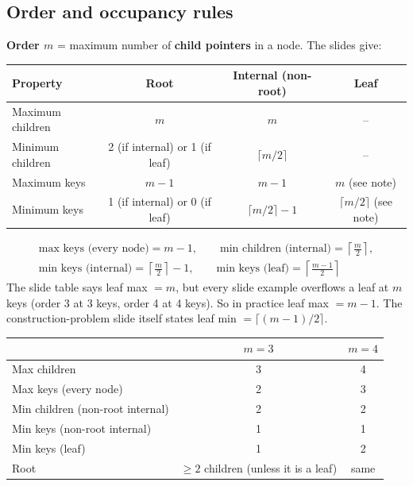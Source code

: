 \documentclass[10pt,a4paper]{article}
\begin{document}
\subsection{Order and occupancy rules}
\textbf{Order $m$} = maximum number of \textbf{child pointers} in a node. The slides give:

\begin{center}
\begin{tabular}{@{}lccc@{}}
\toprule
\textbf{Property} & \textbf{Root} & \textbf{Internal (non-root)} & \textbf{Leaf}\\\midrule
Maximum children & $m$ & $m$ & --\\
Minimum children & 2 (if internal) or 1 (if leaf) & $\lceil m/2 \rceil$ & --\\
Maximum keys & $m-1$ & $m-1$ & $m$ \textcolor{BrickRed}{(see note)}\\
Minimum keys & 1 (if internal) or 0 (if leaf) & $\lceil m/2 \rceil - 1$ & $\lceil m/2 \rceil$ \textcolor{BrickRed}{(see note)}\\
\bottomrule
\end{tabular}
\end{center}

\begin{warnbox}
\begin{gather*}
\text{max keys (every node)} = m-1, \qquad
\text{min children (internal)} = \left\lceil \tfrac{m}{2} \right\rceil,\\
\text{min keys (internal)} = \left\lceil \tfrac{m}{2} \right\rceil - 1, \qquad
\text{min keys (leaf)} = \left\lceil \tfrac{m-1}{2} \right\rceil
\end{gather*}
The slide table says leaf max $= m$, but every slide example overflows a leaf at $m$ keys (order 3 at 3 keys, order 4 at 4 keys). So in practice leaf max $= m-1$. The construction-problem slide itself states leaf min $=\lceil (m-1)/2 \rceil$.
\end{warnbox}

\begin{center}
\begin{tabular}{@{}lcc@{}}
\toprule
 & $m=3$ & $m=4$\\\midrule
Max children & 3 & 4\\
Max keys (every node) & 2 & 3\\
Min children (non-root internal) & 2 & 2\\
Min keys (non-root internal) & 1 & 1\\
Min keys (leaf) & 1 & 2\\
Root & $\ge 2$ children (unless it is a leaf) & same\\
\bottomrule
\end{tabular}
\end{center}
\end{document}
